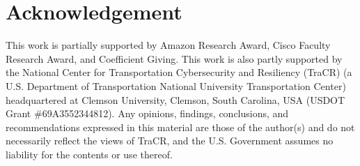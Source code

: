 \documentclass{article}
\theoremstyle{plain}
\theoremstyle{definition}
\theoremstyle{remark}
\begin{document}
\section*{Acknowledgement}
This work is partially supported by Amazon Research Award, Cisco Faculty Research Award, and Coefficient Giving. This work is also partly supported by the National Center for Transportation Cybersecurity and Resiliency (TraCR) (a U.S. Department of Transportation National University Transportation Center) headquartered at Clemson University, Clemson, South Carolina, USA (USDOT Grant \#69A3552344812). Any opinions, findings, conclusions, and recommendations expressed in this material are those of the author(s) and do not necessarily reflect the views of TraCR, and the U.S. Government assumes no liability for the contents or use thereof.






\end{document}
